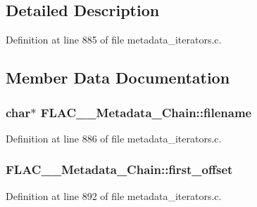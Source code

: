 \subsection{Detailed Description}


Definition at line 885 of file metadata\+\_\+iterators.\+c.



\subsection{Member Data Documentation}
\subsubsection[{\texorpdfstring{filename}{filename}}]{\setlength{\rightskip}{0pt plus 5cm}char$\ast$ F\+L\+A\+C\+\_\+\+\_\+\+Metadata\+\_\+\+Chain\+::filename}\hypertarget{struct_f_l_a_c_____metadata___chain_aaee82fae591aeb0b49df470776743c99}{}\label{struct_f_l_a_c_____metadata___chain_aaee82fae591aeb0b49df470776743c99}


Definition at line 886 of file metadata\+\_\+iterators.\+c.

\subsubsection[{\texorpdfstring{first\+\_\+offset}{first_offset}}]{ F\+L\+A\+C\+\_\+\+\_\+\+Metadata\+\_\+\+Chain\+::first\+\_\+offset}\hypertarget{struct_f_l_a_c_____metadata___chain_ac9dd21a96d3031c7de984299d0e6ac8e}{}\label{struct_f_l_a_c_____metadata___chain_ac9dd21a96d3031c7de984299d0e6ac8e}


Definition at line 892 of file metadata\+\_\+iterators.\+c.

